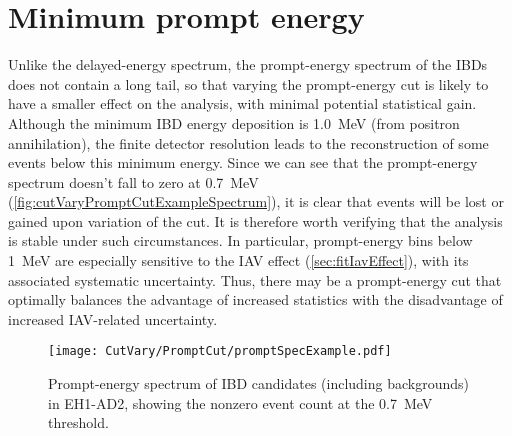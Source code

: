 \documentclass[../thesis.tex]{subfiles}
\begin{document}
\section{Minimum prompt energy}
\label{sec:cutVaryMinPrompt}

Unlike the delayed-energy spectrum, the prompt-energy spectrum of the IBDs does not contain a long tail, so that varying the prompt-energy cut is likely to have a smaller effect on the analysis, with minimal potential statistical gain. Although the minimum IBD energy deposition is 1.0~MeV (from positron annihilation), the finite detector resolution leads to the reconstruction of some events below this minimum energy. Since we can see that the prompt-energy spectrum doesn't fall to zero at 0.7~MeV (\autoref{fig:cutVaryPromptCutExampleSpectrum}), it is clear that events will be lost or gained upon variation of the cut. It is therefore worth verifying that the analysis is stable under such circumstances. In particular, prompt-energy bins below 1~MeV are especially sensitive to the IAV effect (\autoref{sec:fitIavEffect}), with its associated systematic uncertainty. Thus, there may be a prompt-energy cut that optimally balances the advantage of increased statistics with the disadvantage of increased IAV-related uncertainty.

\begin{figure}[h]
  \texttt{[image: CutVary/PromptCut/promptSpecExample.pdf]}
  \caption{Prompt-energy spectrum of IBD candidates (including backgrounds) in EH1-AD2, showing the nonzero event count at the 0.7~MeV threshold.}
  \label{fig:cutVaryPromptCutExampleSpectrum}
\end{figure}
\end{document}
